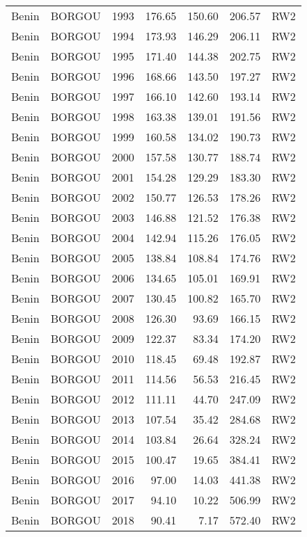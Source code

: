 \begin{longtable}{lllrrrl}
  Benin & BORGOU & 1993 & 176.65 & 150.60 & 206.57 & RW2 \\ 
  Benin & BORGOU & 1994 & 173.93 & 146.29 & 206.11 & RW2 \\ 
  Benin & BORGOU & 1995 & 171.40 & 144.38 & 202.75 & RW2 \\ 
  Benin & BORGOU & 1996 & 168.66 & 143.50 & 197.27 & RW2 \\ 
  Benin & BORGOU & 1997 & 166.10 & 142.60 & 193.14 & RW2 \\ 
  Benin & BORGOU & 1998 & 163.38 & 139.01 & 191.56 & RW2 \\ 
  Benin & BORGOU & 1999 & 160.58 & 134.02 & 190.73 & RW2 \\ 
  Benin & BORGOU & 2000 & 157.58 & 130.77 & 188.74 & RW2 \\ 
  Benin & BORGOU & 2001 & 154.28 & 129.29 & 183.30 & RW2 \\ 
  Benin & BORGOU & 2002 & 150.77 & 126.53 & 178.26 & RW2 \\ 
  Benin & BORGOU & 2003 & 146.88 & 121.52 & 176.38 & RW2 \\ 
  Benin & BORGOU & 2004 & 142.94 & 115.26 & 176.05 & RW2 \\ 
  Benin & BORGOU & 2005 & 138.84 & 108.84 & 174.76 & RW2 \\ 
  Benin & BORGOU & 2006 & 134.65 & 105.01 & 169.91 & RW2 \\ 
  Benin & BORGOU & 2007 & 130.45 & 100.82 & 165.70 & RW2 \\ 
  Benin & BORGOU & 2008 & 126.30 & 93.69 & 166.15 & RW2 \\ 
  Benin & BORGOU & 2009 & 122.37 & 83.34 & 174.20 & RW2 \\ 
  Benin & BORGOU & 2010 & 118.45 & 69.48 & 192.87 & RW2 \\ 
  Benin & BORGOU & 2011 & 114.56 & 56.53 & 216.45 & RW2 \\ 
  Benin & BORGOU & 2012 & 111.11 & 44.70 & 247.09 & RW2 \\ 
  Benin & BORGOU & 2013 & 107.54 & 35.42 & 284.68 & RW2 \\ 
  Benin & BORGOU & 2014 & 103.84 & 26.64 & 328.24 & RW2 \\ 
  Benin & BORGOU & 2015 & 100.47 & 19.65 & 384.41 & RW2 \\ 
  Benin & BORGOU & 2016 & 97.00 & 14.03 & 441.38 & RW2 \\ 
  Benin & BORGOU & 2017 & 94.10 & 10.22 & 506.99 & RW2 \\ 
  Benin & BORGOU & 2018 & 90.41 & 7.17 & 572.40 & RW2 \\ 

\end{longtable}
